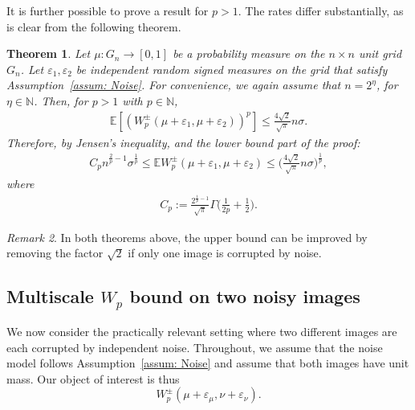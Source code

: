 \documentclass{article}
\theoremstyle{plain}
\newtheorem{thm}{Theorem}[section]
\theoremstyle{definition}
\theoremstyle{remark}
\newtheorem{rmk}[thm]{Remark}
\newcommand{\E}{\mathbb{E}}
\begin{document}
It is further possible to prove a result for $p > 1$. The rates differ substantially, as is clear from the following theorem. 

\begin{thm}
\label{thm: WavBound1Pic}
    Let $\mu:G_n \to [0,1]$ be a probability measure on the $n \times n $ unit grid $G_n$. Let $\varepsilon_1, \varepsilon_2$ be independent random signed measures on the grid that satisfy Assumption~\ref{assum: Noise}. For convenience, we again assume that $n=2^\eta$, for $\eta \in \mathbb{N}$.
    Then, for $p>1$ with $p \in \mathbb{N}$,
    \begin{align}
       \E \left[ \left( W_p^\pm( \mu+\varepsilon_1, \mu + \varepsilon_2  )\right)^p \right]
       \le  
        \frac{4\sqrt{2}}{\sqrt{\pi}} n\sigma .
    \end{align}
    Therefore, by Jensen's inequality, and the lower bound part of the proof:
    \begin{align}
        C_p n^{\frac{2}{p}-1} \sigma^{\frac{1}{p}}
        \le
        \E   W_p^\pm( \mu+\varepsilon_1, \mu+\varepsilon_2 )
        \le  
        \bigg(\frac{4\sqrt{2}}{\sqrt{\pi}} n\sigma \bigg)^{\frac{1}{p}},
    \end{align}
    where
    \begin{align}
        C_p
        :=
        \frac{2^{\frac{1}{p}-1}}{\sqrt{\pi}} \Gamma\Big(\tfrac{1}{2p} + \tfrac{1}{2}\Big).
    \end{align}
\end{thm}



\begin{rmk}
In both theorems above, the upper bound can be improved by removing the factor $\sqrt{2}$ if only one image is corrupted by noise. 
\end{rmk}

\subsection{\texorpdfstring{Multiscale $W_p$}{Wp} bound on two noisy images}\label{subsec: Multiscale Wp on two images}
We now consider the practically relevant setting where two different images are each corrupted by independent noise. 
Throughout, we assume that the noise model follows Assumption~\ref{assum: Noise} and assume that both images have unit mass. 
Our object of interest is thus
\begin{equation}
W_p^\pm(\mu+\varepsilon_\mu,\nu+\varepsilon_\nu).
\end{equation}
\end{document}
